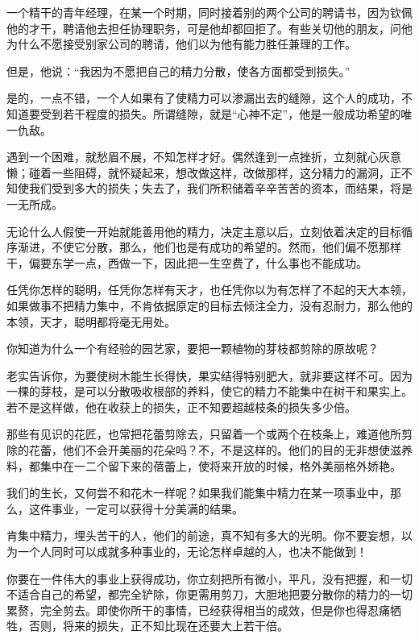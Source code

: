 \documentclass[UTF8,a4paper,8pt]{ctexbook}
\begin{document}
		
		一个精干的青年经理，在某一个时期，同时接着别的两个公司的聘请书，因为钦佩他的才干，聘请他去担任协理职务，可是他却都回拒了。有些关切他的朋友，问他为什么不愿接受别家公司的聘请，他们以为他有能力胜任兼理的工作。
		
		
		但是，他说：“我因为不愿把自己的精力分散，使各方面都受到损失。”
		
		
		是的，一点不错，一个人如果有了使精力可以渗漏出去的缝隙，这个人的成功，不知道要受到若干程度的损失。所谓缝隙，就是“心神不定”，他是一般成功希望的唯一仇敌。
		
		
		遇到一个困难，就愁眉不展，不知怎样才好。偶然逢到一点挫折，立刻就心灰意懒；碰着一些阻碍，就怀疑起来，想改做这样，改做那样，这分精力的漏洞，正不知使我们受到多大的损失；失去了，我们所积储着辛辛苦苦的资本，而结果，将是一无所成。
		
		
		无论什么人假使一开始就能善用他的精力，决定主意以后，立刻依着决定的目标循序渐进，不使它分散，那么，他们也是有成功的希望的。然而，他们偏不愿那样干，偏要东学一点，西做一下，因此把一生空费了，什么事也不能成功。
		
		
		任凭你怎样的聪明，任凭你怎样有天才，也任凭你以为有怎样了不起的天大本领，如果做事不把精力集中，不肯依据原定的目标去倾注全力，没有忍耐力，那么他的本领，天才，聪明都将毫无用处。
		
		
		你知道为什么一个有经验的园艺家，要把一颗植物的芽枝都剪除的原故呢？
		
		
		老实告诉你，为要使树木能生长得快，果实结得特别肥大，就非要这样不可。因为一棵的芽枝，是可以分散吸收根部的养料，使它的精力不能集中在树干和果实上。若不是这样做，他在收获上的损失，正不知要超越枝条的损失多少倍。
		
		
		那些有见识的花匠，也常把花蕾剪除去，只留着一个或两个在枝条上，难道他所剪除的花蕾，他们不会开美丽的花朵吗？不，不是这样的。他们的目的无非想使滋养料，都集中在一二个留下来的蓓蕾上，使将来开放的时候，格外美丽格外娇艳。
		
		
		我们的生长，又何尝不和花木一样呢？如果我们能集中精力在某一项事业中，那么，这件事业，一定可以获得十分美满的结果。
		
		
		肯集中精力，埋头苦干的人，他们的前途，真不知有多大的光明。你不要妄想，以为一个人同时可以成就多种事业的，无论怎样卓越的人，也决不能做到！
		
		
		你要在一件伟大的事业上获得成功，你立刻把所有微小，平凡，没有把握，和一切不适合自己的希望，都完全铲除，你更需用剪刀，大胆地把要分散你的精力的一切累赘，完全剪去。即使你所干的事情，已经获得相当的成效，但是你也得忍痛牺牲，否则，将来的损失，正不知比现在还要大上若干倍。
		
\end{document}
